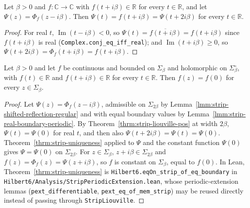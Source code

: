 \begin{lemma}
    \label{lmm:strip-real-boundary-periodic}
    \leanok
    Let $\beta > 0$ and $f : \mathbb{C} \to \mathbb{C}$ with $f(t + i\beta) \in \mathbb{R}$ for every $t \in \mathbb{R}$, and let $\Psi(z) = \Phi_f(z - i\beta)$. Then $\Psi(t) = f(t + i\beta) = \Psi(t + 2i\beta)$ for every $t \in \mathbb{R}$.
\end{lemma}
\begin{proof}
    \leanok
    For real $t$, $\operatorname{Im}(t - i\beta) < 0$, so $\Psi(t) = \overline{f(t + i\beta)} = f(t + i\beta)$ since $f(t + i\beta)$ is real (\texttt{Complex.conj\_eq\_iff\_real}); and $\operatorname{Im}(t + i\beta) \ge 0$, so $\Psi(t + 2i\beta) = \Phi_f(t + i\beta) = f(t + i\beta)$.
\end{proof}

\begin{lemma}
    \label{lmm:strip-real-boundary-constant}
    \leanok
    Let $\beta > 0$ and let $f$ be continuous and bounded on $\Sigma_\beta$ and holomorphic on $\Sigma^\circ_\beta$, with $f(t) \in \mathbb{R}$ and $f(t + i\beta) \in \mathbb{R}$ for every $t \in \mathbb{R}$. Then $f(z) = f(0)$ for every $z \in \Sigma_\beta$.
\end{lemma}
\begin{proof}
    \leanok
    Let $\Psi(z) = \Phi_f(z - i\beta)$, admissible on $\Sigma_{2\beta}$ by Lemma~\ref{lmm:strip-shifted-reflection-regular} and with equal boundary values by Lemma~\ref{lmm:strip-real-boundary-periodic}. By Theorem~\ref{thrm:strip-liouville-pos} at width $2\beta$, $\Psi(t) = \Psi(0)$ for real $t$, and then also $\Psi(t + 2i\beta) = \Psi(t) = \Psi(0)$. Theorem~\ref{thrm:strip-uniqueness} applied to $\Psi$ and the constant function $\Psi(0)$ gives $\Psi = \Psi(0)$ on $\Sigma_{2\beta}$. For $z \in \Sigma_\beta$, $z + i\beta \in \Sigma_{2\beta}$ and $f(z) = \Phi_f(z) = \Psi(z + i\beta)$, so $f$ is constant on $\Sigma_\beta$, equal to $f(0)$. In Lean, Theorem~\ref{thrm:strip-uniqueness} is \texttt{Hilbert6.eqOn\_strip\_of\_eq\_boundary} in \texttt{Hilbert6/Analysis/StripPeriodicExtension.lean}, whose periodic-extension lemmas (\texttt{pext\_differentiable}, \texttt{pext\_eq\_of\_mem\_strip}) may be reused directly instead of passing through \texttt{StripLiouville}.
\end{proof}

